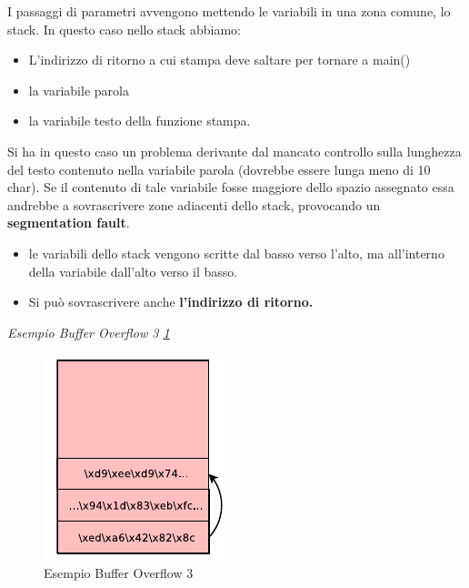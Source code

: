 \documentclass[12pt]{article}
\begin{document}
				I passaggi di parametri avvengono mettendo le variabili in una zona comune, lo stack. In questo caso nello stack abbiamo:
				\begin{itemize}
					\item L'indirizzo di ritorno a cui stampa deve saltare per tornare a main()
					\item la variabile parola 
					\item la variabile testo della funzione stampa.
				\end{itemize}
				Si ha in questo caso un problema derivante dal mancato controllo sulla lunghezza del testo contenuto nella variabile parola (dovrebbe essere lunga meno di 10 char). Se il contenuto di tale variabile fosse maggiore dello spazio assegnato essa andrebbe a sovrascrivere zone adiacenti dello stack, provocando un \textbf{segmentation fault}.
				\begin{itemize}
					\item le variabili dello stack vengono scritte dal basso verso l'alto, ma all'interno della variabile dall'alto verso il basso.
					\item Si può sovrascrivere anche \textbf{l'indirizzo di ritorno.}
				\end{itemize}
				
				\textit{Esempio Buffer Overflow 3 \ref{fig:39}}\\
				\begin{figure}[h!]
					\centering
					\includegraphics[scale=0.90]{img/stack2.PNG}
					\caption{Esempio Buffer Overflow 3 \label{fig:39}}
				\end{figure}\\
				
\end{document}

